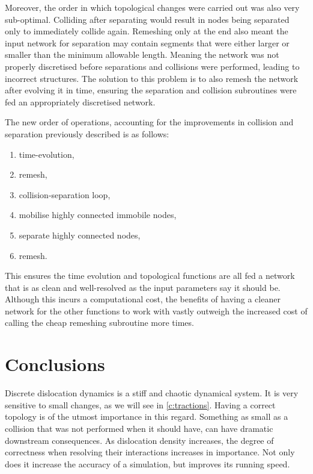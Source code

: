 Moreover, the order in which topological changes were carried out was also very sub-optimal. Colliding after separating would result in nodes being separated only to immediately collide again. Remeshing only at the end also meant the input network for separation may contain segments that were either larger or smaller than the minimum allowable length. Meaning the network was not properly discretised before separations and collisions were performed, leading to incorrect structures. The solution to this problem is to also remesh the network after evolving it in time, ensuring the separation and collision subroutines were fed an appropriately discretised network.

The new order of operations, accounting for the improvements in collision and separation previously described is as follows:
\begin{enumerate}
    \item time-evolution,
    \item remesh,
    \item collision-separation loop,
    \item mobilise highly connected immobile nodes,
    \item separate highly connected nodes,
    \item remesh.
\end{enumerate}
This ensures the time evolution and topological functions are all fed a network that is as clean and well-resolved as the input parameters say it should be. Although this incurs a computational cost, the benefits of having a cleaner network for the other functions to work with vastly outweigh the increased cost of calling the cheap remeshing subroutine more times.

\section{Conclusions}

Discrete dislocation dynamics is a stiff and chaotic dynamical system. It is very sensitive to small changes, as we will see in \cref{c:tractions}. Having a correct topology is of the utmost importance in this regard. Something as small as a collision that was not performed when it should have, can have dramatic downstream consequences. As dislocation density increases, the degree of correctness when resolving their interactions increases in importance. Not only does it increase the accuracy of a simulation, but improves its running speed.

